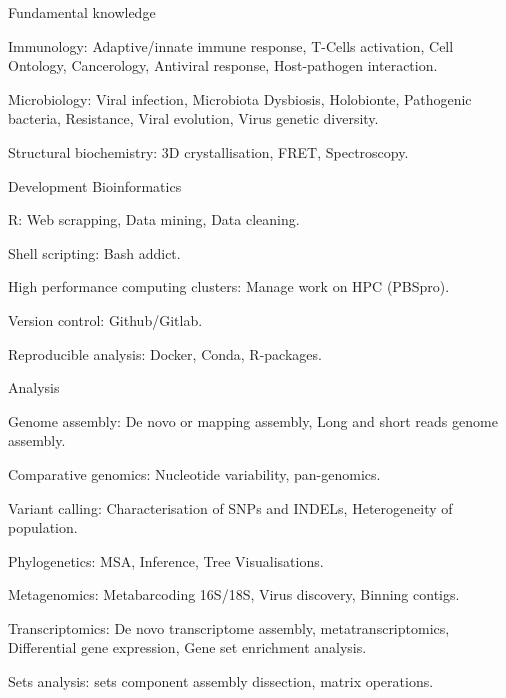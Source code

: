 \begin{cventries}
  \cventry
    {Fundamental knowledge} %
    {} %
    {} %
    {} %
    {
      \begin{cvitems} %
        \item {Immunology: Adaptive/innate immune response, T-Cells activation, Cell Ontology, Cancerology, Antiviral response, Host-pathogen interaction.}
        \item {Microbiology: Viral infection, Microbiota Dysbiosis, Holobionte, Pathogenic bacteria, Resistance, Viral evolution, Virus genetic diversity.}
        \item {Structural biochemistry: 3D crystallisation, FRET, Spectroscopy.}
      \end{cvitems}
    }

  \cventry
    {Development} %
    {Bioinformatics} %
    {} %
    {} %
    {
      \begin{cvitems} %
        \item {R: Web scrapping, Data mining, Data cleaning.}
        \item {Shell scripting: Bash addict.}
        \item {High performance computing clusters: Manage work on HPC (PBSpro).}
        \item {Version control: Github/Gitlab.}
        \item {Reproducible analysis: Docker, Conda, R-packages.}
      \end{cvitems}
    }

  \cventry
    {Analysis} %
    {} %
    {} %
    {} %
    {
      \begin{cvitems} %
        \item {Genome assembly: De novo or mapping assembly, Long and short reads genome assembly.}
        \item {Comparative genomics: Nucleotide variability, pan-genomics.}
        \item {Variant calling: Characterisation of SNPs and INDELs, Heterogeneity of population.}
        \item {Phylogenetics: MSA, Inference, Tree Visualisations.}
        \item {Metagenomics: Metabarcoding 16S/18S, Virus discovery, Binning contigs.}
        \item {Transcriptomics: De novo transcriptome assembly, metatranscriptomics, Differential gene expression, Gene set enrichment analysis.}
        \item {Sets analysis: sets component assembly dissection, matrix operations.}
      \end{cvitems}
    }


\end{cventries}
